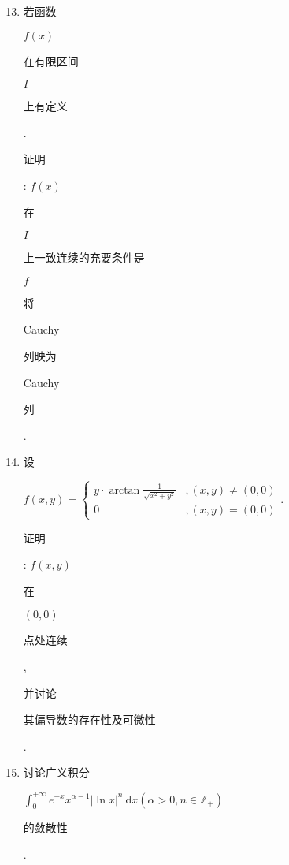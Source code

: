 \documentclass[10pt]{article}
\begin{document}
\begin{enumerate}
  \setcounter{enumi}{12}
  \item \begin{CJK}{UTF8}{mj}若函数\end{CJK} $f(x)$ \begin{CJK}{UTF8}{mj}在有限区间\end{CJK} $I$ \begin{CJK}{UTF8}{mj}上有定义\end{CJK}. \begin{CJK}{UTF8}{mj}证明\end{CJK}: $f(x)$ \begin{CJK}{UTF8}{mj}在\end{CJK} $I$ \begin{CJK}{UTF8}{mj}上一致连续的充要条件是\end{CJK} $f$ \begin{CJK}{UTF8}{mj}将\end{CJK} Cauchy \begin{CJK}{UTF8}{mj}列映为\end{CJK} Cauchy \begin{CJK}{UTF8}{mj}列\end{CJK}.

  \item \begin{CJK}{UTF8}{mj}设\end{CJK} $f(x, y)=\left\{\begin{array}{ll}y \cdot \arctan \frac{1}{\sqrt{x^{2}+y^{2}}} & ,(x, y) \neq(0,0) \\ 0 & ,(x, y)=(0,0)\end{array}\right.$. \begin{CJK}{UTF8}{mj}证明\end{CJK}: $f(x, y)$ \begin{CJK}{UTF8}{mj}在\end{CJK} $(0,0)$ \begin{CJK}{UTF8}{mj}点处连续\end{CJK}, \begin{CJK}{UTF8}{mj}并讨论\end{CJK} \begin{CJK}{UTF8}{mj}其偏导数的存在性及可微性\end{CJK}.

  \item \begin{CJK}{UTF8}{mj}讨论广义积分\end{CJK} $\int_{0}^{+\infty} e^{-x} x^{\alpha-1}|\ln x|^{n} \mathrm{~d} x\left(\alpha>0, n \in \mathbb{Z}_{+}\right)$\begin{CJK}{UTF8}{mj}的敛散性\end{CJK}.


\end{enumerate}
\end{document}
